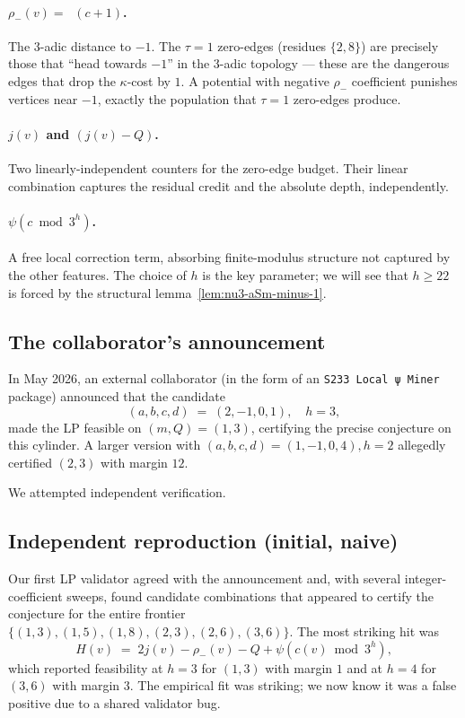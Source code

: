 \documentclass[11pt,a4paper]{article}
\theoremstyle{plain}
\theoremstyle{definition}
\DeclareMathOperator{\nuthree}{\nu_3}
\begin{document}
\paragraph{$\rho_-(v) = \nuthree(c + 1)$.}
The 3-adic distance to $-1$. The $\tau = 1$ zero-edges (residues
$\{2, 8\}$) are precisely those that ``head towards $-1$'' in the
3-adic topology — these are the dangerous edges that drop the
$\kappa$-cost by $1$. A potential with negative $\rho_-$ coefficient
punishes vertices near $-1$, exactly the population that
$\tau = 1$ zero-edges produce.

\paragraph{$j(v)$ and $(j(v) - Q)$.}
Two linearly-independent counters for the zero-edge budget. Their
linear combination captures the residual credit and the absolute
depth, independently.

\paragraph{$\psi(c \bmod 3^h)$.}
A free local correction term, absorbing finite-modulus structure
not captured by the other features. The choice of $h$ is the key
parameter; we will see that $h \ge 22$ is forced by the structural
lemma~\ref{lem:nu3-aSm-minus-1}.

\subsection{The collaborator's announcement}

In May 2026, an external collaborator (in the form of an
\texttt{S233 Local ψ Miner} package) announced that the candidate
\[
  (a, b, c, d) \;=\; (2, -1, 0, 1), \quad h = 3,
\]
made the LP feasible on $(m, Q) = (1, 3)$, certifying the precise
conjecture on this cylinder. A larger version with
$(a, b, c, d) = (1, -1, 0, 4), h = 2$ allegedly certified $(2, 3)$
with margin $12$.

We attempted independent verification.

\subsection{Independent reproduction (initial, naive)}

Our first LP validator agreed with the announcement and, with
several integer-coefficient sweeps, found candidate combinations
that appeared to certify the conjecture for the entire frontier
$\{(1,3), (1,5), (1,8), (2,3), (2,6), (3,6)\}$. The most striking
hit was
\[
  H(v) \;=\; 2 j(v) - \rho_-(v) - Q + \psi(c(v) \bmod 3^h),
\]
which reported feasibility at $h = 3$ for $(1, 3)$ with margin $1$
and at $h = 4$ for $(3, 6)$ with margin $3$. The empirical
fit was striking; we now know it was a false positive due to a
shared validator bug.
\end{document}
